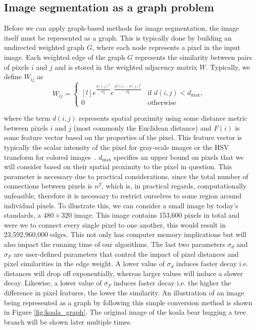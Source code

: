 \documentclass[conference]{IEEEtran}
\begin{document}

\subsection{Image segmentation as a graph problem}\label{image_to_graph}

Before we can apply graph-based methods for image segmentation, the image itself must be represented as a graph. This is typically done by building an undirected weighted graph $G$, where each node represents a pixel in the input image. Each weighted edge of the graph $G$ represents the similarity between pairs of pixels $i$ and $j$ and is stored in the weighted adjacency matrix $W$. Typically, we define $W_{ij}$ as
\begin{equation}
    W_{ij} = \left \{ \begin{matrix*}[l]
    e^{ \frac{d(i, j)^2}{\sigma_d^2} } e^{ \frac{\left \vert F(i) - F(j) \right \vert^2}{\sigma_F^2} } & \text{if } d(i, j) < d_{\text{max}}\text{,} \\
    0 & \text{otherwise}
    \end{matrix*}\right.
\end{equation}

where the term $d(i, j)$ represents spatial proximity using some distance metric between pixels $i$ and $j$ (most commonly the Euclidean distance) and $F(i)$ is some feature vector based on the properties of the pixel. This feature vector is typically the scalar intensity of the pixel for gray-scale images or the HSV transform for colored images~\cite{browet2011community}. $d_{\text{max}}$ specifies an upper bound on pixels that we will consider based on their spatial proximity to the pixel in question. This parameter is necessary due to practical considerations, since the total number of connections between pixels is $n^2$, which is, in practical regards, computationally unfeasible, therefore it is necessary to restrict ourselves to some region around individual pixels. To illustrate this, we can consider a small image by today's standards, a $480 \times 320$ image. This image contains 153,600 pixels in total and were we to connect every single pixel to one another, this would result in 23,592,960,000 edges. This not only has computer memory implications but will also impact the running time of our algorithms. The last two parameters $\sigma_d$ and $\sigma_F$ are user-defined parameters that control the impact of pixel distances and pixel similarities in the edge weight. A lower value of $\sigma_d$ induces faster decay i.e. distances will drop off exponentially, whereas larger values will induce a slower decay. Likewise, a lower value of $\sigma_F$ induces faster decay i.e. the higher the difference in pixel features, the lower the similarity. An illustration of an image being represented as a graph by following this simple conversion method is shown in Figure \ref{fig:koala_graph}. The original image of the koala bear hugging a tree branch will be shown later multiple times.
\end{document}
